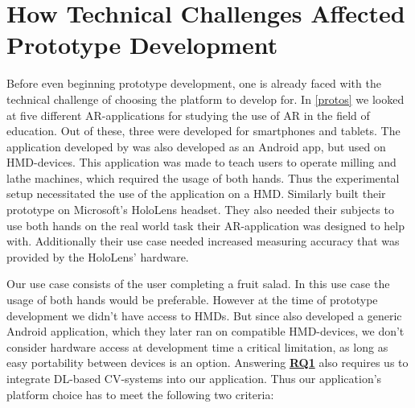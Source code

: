 



\section{How Technical Challenges Affected Prototype Development} \label{devChallenges}


Before even beginning prototype development, one is already faced with the 
technical challenge of choosing the platform to develop for. In \ref{protos} 
we looked at five different AR-applications for studying the use of AR in the 
field of education. Out of these, three were developed for smartphones and 
tablets.\cite{pylvanainen}\cite{estrada}\cite{LinAndLee2020} The application 
developed by \textcite{reyesEtAl2016} was also developed as an Android app, 
but used on HMD-devices. This application was made to teach users to operate 
milling and lathe machines, which required the usage of both hands. Thus the 
experimental setup necessitated the use of the application on a HMD. Similarly 
\textcite{VanGestel2024} built their prototype on Microsoft's HoloLens 
headset. They also needed their subjects to use both hands on the real world 
task their AR-application was designed to help with. Additionally their use 
case needed increased measuring accuracy that was provided by the HoloLens' 
hardware.\par
	Our use case consists of the user completing a fruit salad. In this 
use case the usage of both hands would be preferable. However at the time of 
prototype development we didn't have access to HMDs. But since 
\textcite{reyesEtAl2016} also developed a generic Android application, which 
they later ran on compatible HMD-devices, we don't consider hardware access 
at development time a critical limitation, as long as easy portability between 
devices is an option. Answering \hyperref[rq1]{\textbf{RQ1}} also requires us 
to integrate DL-based CV-systems into our application. Thus our application's 
platform choice has to meet the following two criteria:
